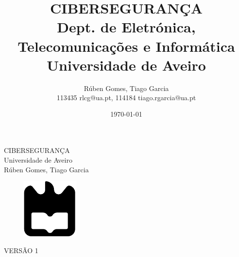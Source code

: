 \documentclass{report}
\begin{document}
%
\def\titulo{CIBERSEGURANÇA}
\def\data{DATA}
\def\autores{Rúben Gomes, Tiago Garcia}
\def\autorescontactos{113435 rlcg@ua.pt, 114184 tiago.rgarcia@ua.pt}
\def\versao{VERSÃO 1}
\def\departamento{Dept. de Eletrónica, Telecomunicações e Informática}
\def\empresa{Universidade de Aveiro}
\def\logotipo{ua.pdf}

%
%
\begin{titlepage}

\begin{center}
%
\vspace*{50mm}
%
{\Huge \titulo}\\ 
%
\vspace{10mm}
%
{\Large \empresa}\\
%
\vspace{10mm}
%
{\LARGE \autores}\\ 
%
\vspace{30mm}
%
\begin{figure}[h]
    \center
    \includegraphics{ua}
\end{figure}
%
\vspace{30mm}
\end{center}
%
\begin{flushright}
\versao
\end{flushright}
\end{titlepage}

\title{%
{\Huge\textbf{\titulo}}\\
{\Large \departamento\\ \empresa}
}
%
\author{%
    \autores \\
    \autorescontactos
}
%
\date{\today}
%
\maketitle

\end{document}
